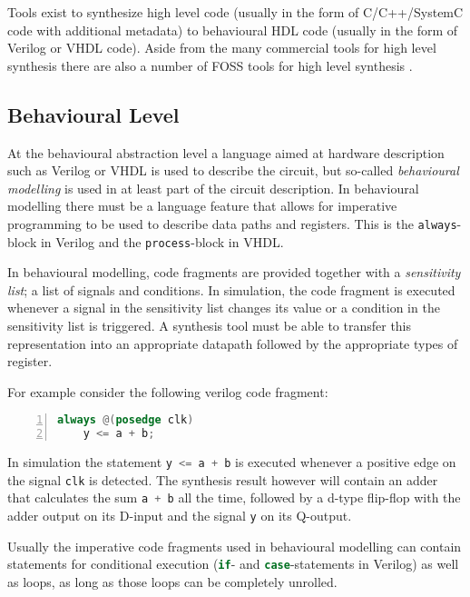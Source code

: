 Tools exist to synthesize high level code (usually in the form of C/C++/SystemC
code with additional metadata) to behavioural HDL code (usually in the form of
Verilog or VHDL code). Aside from the many commercial tools for high level synthesis
there are also a number of FOSS tools for high level synthesis
 .

\subsection{Behavioural Level}

At the behavioural abstraction level a language aimed at hardware description such
as Verilog or VHDL is used to describe the circuit, but so-called {\it behavioural
modelling} is used in at least part of the circuit description. In behavioural
modelling there must be a language feature that allows for imperative programming to be used to
describe data paths and registers. This is the {\tt always}-block in Verilog and
the {\tt process}-block in VHDL.

In behavioural modelling, code fragments are provided together with a {\it
sensitivity list}; a list of signals and conditions. In simulation, the code
fragment is executed whenever a signal in the sensitivity list changes its
value or a condition in the sensitivity list is triggered. A synthesis tool
must be able to transfer this representation into an appropriate datapath followed
by the appropriate types of register.

For example consider the following verilog code fragment:

\begin{lstlisting}[numbers=left,frame=single,language=Verilog]
always @(posedge clk)
	y <= a + b;
\end{lstlisting}

In simulation the statement \lstinline[language=Verilog]{y <= a + b} is executed whenever
a positive edge on the signal \lstinline[language=Verilog]{clk} is detected. The synthesis
result however will contain an adder that calculates the sum \lstinline[language=Verilog]{a + b}
all the time, followed by a d-type flip-flop with the adder output on its D-input and the
signal \lstinline[language=Verilog]{y} on its Q-output.

Usually the imperative code fragments used in behavioural modelling can contain
statements for conditional execution (\lstinline[language=Verilog]{if}- and
\lstinline[language=Verilog]{case}-statements in Verilog) as well as loops,
as long as those loops can be completely unrolled.

